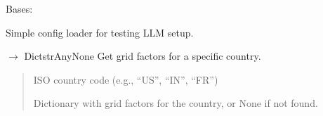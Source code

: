 \documentclass[letterpaper,10pt,english]{sphinxmanual}
\begin{document}
\begin{fulllineitems}
\label{\detokenize{core.config_loader:core.config_loader.ConfigLoader}}
\pysigstartsignatures
\pysiglinewithargsret
{}
{}
{}
\pysigstopsignatures
\sphinxAtStartPar
Bases: 

\sphinxAtStartPar
Simple config loader for testing LLM setup.

\begin{fulllineitems}
\label{\detokenize{core.config_loader:core.config_loader.ConfigLoader.get_country_grid_factors}}
\pysigstartsignatures
\pysiglinewithargsret
{}
{}
{{ $\rightarrow$ Dict\DUrole{p}{{[}}strAny\DUrole{p}{{]}}None}}
\pysigstopsignatures
\sphinxAtStartPar
Get grid factors for a specific country.
\begin{quote}\begin{description}
\sphinxAtStartPar
{} \textendash{} ISO country code (e.g., “US”, “IN”, “FR”)

\sphinxAtStartPar
Dictionary with grid factors for the country, or None if not found.

\end{description}\end{quote}

\end{fulllineitems}



\end{fulllineitems}
\end{document}
